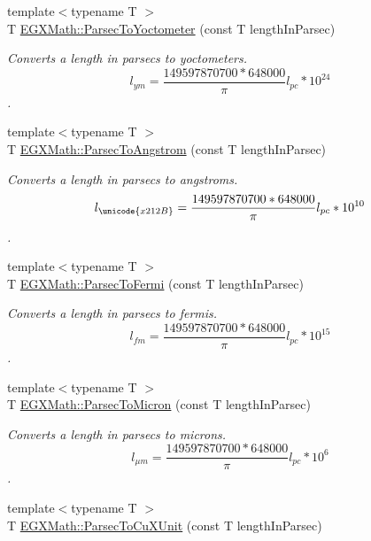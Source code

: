 \begin{DoxyCompactItemize}
{\footnotesize template$<$typename T $>$ }\\T \mbox{\hyperlink{group___e_g_x_math-_conversions-_length_conversions-_astronomical-_parsec-_s_i_ga2c745c68a73ead9c11af6bc86ce3e3f6}{E\+G\+X\+Math\+::\+Parsec\+To\+Yoctometer}} (const T length\+In\+Parsec)
\begin{DoxyCompactList}\small\item\em Converts a length in parsecs to yoctometers. \[ l_{ym}=\frac{149597870700 * 648000}{\pi}l_{pc} * 10^{24} \]. \end{DoxyCompactList}\item 
{\footnotesize template$<$typename T $>$ }\\T \mbox{\hyperlink{group___e_g_x_math-_conversions-_length_conversions-_astronomical-_parsec-_non-_s_i_gae9721658cb4d8b9e1cfd85f20d646702}{E\+G\+X\+Math\+::\+Parsec\+To\+Angstrom}} (const T length\+In\+Parsec)
\begin{DoxyCompactList}\small\item\em Converts a length in parsecs to angstroms. \[ l_{\unicode{x212B}}=\frac{149597870700 * 648000}{\pi}l_{pc} * 10^{10} \]. \end{DoxyCompactList}\item 
{\footnotesize template$<$typename T $>$ }\\T \mbox{\hyperlink{group___e_g_x_math-_conversions-_length_conversions-_astronomical-_parsec-_non-_s_i_gac157e45cbd0a0ef15a52dcc59a7b40ad}{E\+G\+X\+Math\+::\+Parsec\+To\+Fermi}} (const T length\+In\+Parsec)
\begin{DoxyCompactList}\small\item\em Converts a length in parsecs to fermis. \[ l_{fm}=\frac{149597870700 * 648000}{\pi}l_{pc} * 10^{15} \]. \end{DoxyCompactList}\item 
{\footnotesize template$<$typename T $>$ }\\T \mbox{\hyperlink{group___e_g_x_math-_conversions-_length_conversions-_astronomical-_parsec-_non-_s_i_ga9460305baf1a39635da24198d888a91b}{E\+G\+X\+Math\+::\+Parsec\+To\+Micron}} (const T length\+In\+Parsec)
\begin{DoxyCompactList}\small\item\em Converts a length in parsecs to microns. \[ l_{\mu m}=\frac{149597870700 * 648000}{\pi}l_{pc} * 10^{6} \]. \end{DoxyCompactList}\item 
{\footnotesize template$<$typename T $>$ }\\T \mbox{\hyperlink{group___e_g_x_math-_conversions-_length_conversions-_astronomical-_parsec-_non-_s_i_gad21a910de08e37197d58edf64c377222}{E\+G\+X\+Math\+::\+Parsec\+To\+Cu\+X\+Unit}} (const T length\+In\+Parsec)

\end{DoxyCompactItemize}
